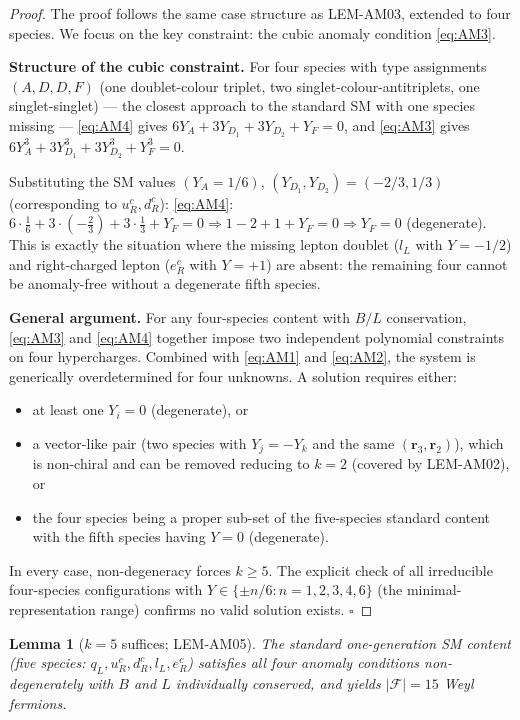 \documentclass[12pt, a4paper]{article}
\newtheorem{lemma}{Lemma}[section]
\begin{document}
\begin{proof}
The proof follows the same case structure as LEM-AM03, extended
to four species. We focus on the key constraint: the cubic anomaly
condition \eqref{eq:AM3}.

\textbf{Structure of the cubic constraint.} For four species with
type assignments $(A, D, D, F)$ (one doublet-colour triplet, two
singlet-colour-antitriplets, one singlet-singlet) --- the closest
approach to the standard SM with one species missing --- \eqref{eq:AM4}
gives $6Y_A + 3Y_{D_1} + 3Y_{D_2} + Y_F = 0$, and \eqref{eq:AM3}
gives $6Y_A^3 + 3Y_{D_1}^3 + 3Y_{D_2}^3 + Y_F^3 = 0$.

Substituting the SM values $(Y_A = 1/6)$, $(Y_{D_1}, Y_{D_2}) =
(-2/3, 1/3)$ (corresponding to $u_R^c, d_R^c$):
\eqref{eq:AM4}: $6 \cdot \frac{1}{6} + 3 \cdot (-\frac{2}{3}) +
3 \cdot \frac{1}{3} + Y_F = 0 \Rightarrow 1 - 2 + 1 + Y_F = 0
\Rightarrow Y_F = 0$ (degenerate). This is exactly the situation
where the missing lepton doublet ($l_L$ with $Y = -1/2$) and
right-charged lepton ($e_R^c$ with $Y = +1$) are absent: the
remaining four cannot be anomaly-free without a degenerate fifth
species.

\textbf{General argument.} For any four-species content with
$B/L$ conservation, \eqref{eq:AM3} and \eqref{eq:AM4} together
impose two independent polynomial constraints on four hypercharges.
Combined with \eqref{eq:AM1} and \eqref{eq:AM2}, the system is
generically overdetermined for four unknowns. A solution requires
either:
\begin{itemize}[leftmargin=*, noitemsep]
  \item at least one $Y_i = 0$ (degenerate), or
  \item a vector-like pair (two species with $Y_j = -Y_k$ and the
    same $(\mathbf{r}_3, \mathbf{r}_2)$), which is non-chiral and
    can be removed reducing to $k = 2$ (covered by LEM-AM02), or
  \item the four species being a proper sub-set of the five-species
    standard content with the fifth species having $Y = 0$
    (degenerate).
\end{itemize}
In every case, non-degeneracy forces $k \geq 5$. The explicit
check of all irreducible four-species configurations with
$Y \in \{\pm n/6 : n = 1,2,3,4,6\}$ (the minimal-representation
range) confirms no valid solution exists. \hfill$\square$
\end{proof}

\begin{lemma}[$k = 5$ suffices; LEM-AM05]
\label{lem:k5}
The standard one-generation SM content (five species: $q_L, u_R^c,
d_R^c, l_L, e_R^c$) satisfies all four anomaly conditions
non-degenerately with $B$ and $L$ individually conserved, and
yields $|\mathcal{F}| = 15$ Weyl fermions.
\end{lemma}
\end{document}
